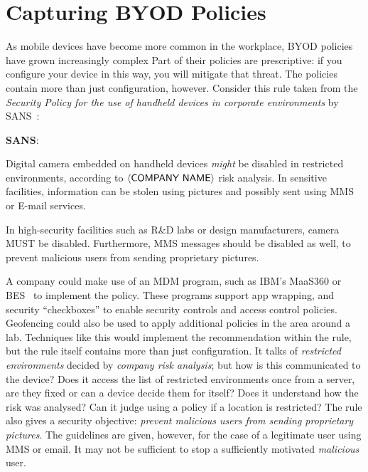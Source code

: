 \documentclass{llncs}
\newenvironment{policyrule}[1]{%
  \begin{mdframed}\footnotesize
      \noindent\textbf{\sffamily #1}:~\itshape%
}{%
  \end{mdframed}
}
\begin{document}
\section{Capturing BYOD Policies}
\label{sec:idea}

As mobile devices have become more common in the workplace, BYOD policies have grown increasingly complex
Part of their policies are prescriptive:  if you configure your device in this way, you will mitigate that threat.
The policies contain more than just configuration, however.
Consider this rule taken from the \emph{Security Policy for the use of handheld devices in corporate environments} by SANS~\cite{nicholas_r._c._guerin_security_2008}:

\newcommand{\textbra}[1]{\ensuremath{\left\langle \text{\sffamily #1} \right\rangle}}
\begin{policyrule}{SANS}
  Digital camera embedded on handheld devices \emph{might} be disabled in restricted environments, according to \textbra{COMPANY NAME} risk analysis.
  In sensitive facilities, information can be stolen using pictures and possibly sent using MMS or E-mail services.

  In high-security facilities such as R\&D labs or design manufacturers, camera MUST be disabled.
  Furthermore, MMS messages should be disabled as well, to prevent malicious users from sending proprietary pictures.
\end{policyrule}

A company could make use of an \ac{MDM} program, such as IBM's MaaS360 or \ac{BES}~\cite{_ibm_????,_secure_????} to implement the policy.
These programs support app wrapping, and security ``checkboxes'' to enable security controls and access control policies.
Geofencing could also be used to apply additional policies in the area around a lab.
Techniques like this would implement the recommendation within the rule, but the rule itself contains more than just configuration.
It talks of \emph{restricted environments} decided by \emph{company risk analysis}; but how is this communicated to the device?
Does it access the list of restricted environments once from a server, are they fixed or can a device decide them for itself?
Does it understand how the risk was analysed?
Can it judge using a policy if a location is restricted?
The rule also gives a security objective: \emph{prevent malicious users from sending proprietary pictures}.
The guidelines are given, however, for the case of a legitimate user using MMS or email.
It may not be sufficient to stop a sufficiently motivated \emph{malicious} user.
\end{document}
